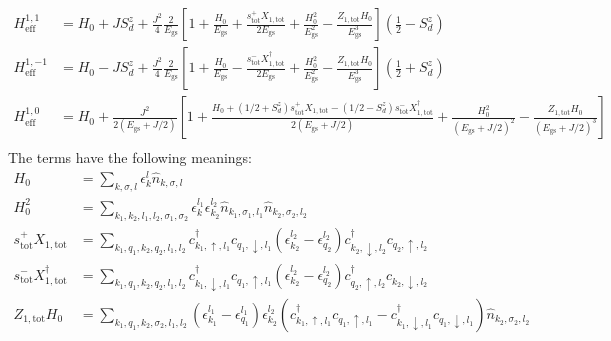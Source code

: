 \documentclass{revtex4-2}
\begin{document}
\begin{align}
	H_\text{eff}^{1, 1} &= H_0 + J S_d^z + \frac{J^2}{4}\frac{2}{E_\text{gs}}\left[1 + \frac{H_0}{E_\text{gs}} + \frac{s^+_\text{tot}X_{1,\text{tot}}}{2 E_\text{gs}} + \frac{H_0^2 }{E_\text{gs}^2} - \frac{Z_{1,\text{tot}} H_0}{E_\text{gs}^3}\right] \left(\frac{1}{2} - S_d^z\right) \\
	H_\text{eff}^{1, -1} &= H_0 - J S_d^z + \frac{J^2}{4}\frac{2}{E_\text{gs}}\left[1 + \frac{H_0}{E_\text{gs}}  - \frac{s^-_\text{tot}X^\dagger_{1,\text{tot}}}{2 E_\text{gs}}  + \frac{H_0^2}{E_\text{gs}^2}  - \frac{ Z_{1,\text{tot}} H_0}{E_\text{gs}^3}\right] \left(\frac{1}{2} + S_d^z\right) \\
	H_\text{eff}^{1, 0} &= H_0 + \frac{J^2}{2\left(E_\text{gs} + J/2\right)}\left[1 + \frac{ H_0 + \left(1/2 + S_d^z\right) s^+_\text{tot}X_{1,\text{tot}} - \left(1/2 - S_d^z\right) s^-_\text{tot}X^\dagger_{1,\text{tot}}}{2 \left(E_\text{gs} + J/2\right)} + \frac{H_0^2}{\left(E_\text{gs} + J/2\right)^2} - \frac{Z_{1,\text{tot}} H_0}{\left(E_\text{gs} + J/2\right)^3} \right] \\
\end{align}
The terms have the following meanings:
\begin{align}
	H_0 &= \sum_{k,\sigma,l}\epsilon_k^l \hat n_{k,\sigma,l}\\
	H_0^2 &= \sum_{k_1,k_2,l_1,l_2,\sigma_1,\sigma_2}\epsilon_k^{l_1}\epsilon_{k_2}^{l_2} \hat n_{k_1,\sigma_1,l_1}\hat n_{k_2,\sigma_2,l_2}\\
	s^+_\text{tot}X_{1,\text{tot}} &= \sum_{k_1,q_1,k_2,q_2,l_1,l_2}c^\dagger_{k_1, \uparrow, l_1}c_{q_1, \downarrow, l_1} \left(\epsilon_{k_2}^{l_2} - \epsilon_{q_2}^{l_2}\right) c^\dagger_{k_2, \downarrow, l_2}c_{q_2, \uparrow, l_2}\\
	s^-_\text{tot}X^\dagger_{1,\text{tot}} &= \sum_{k_1,q_1,k_2,q_2,l_1,l_2}c^\dagger_{k_1, \downarrow, l_1}c_{q_1, \uparrow, l_1} \left(\epsilon_{k_2}^{l_2} - \epsilon_{q_2}^{l_2}\right) c^\dagger_{q_2, \uparrow, l_2}c_{k_2, \downarrow, l_2}\\
	Z_{1,\text{tot}} H_0 &= \sum_{k_1,q_1,k_2,\sigma_2,l_1,l_2}\left(\epsilon_{k_1}^{l_1} - \epsilon_{q_1}^{l_1}\right) \epsilon_{k_2}^{l_2} \left(c^\dagger_{k_1, \uparrow, l_1}c_{q_1, \uparrow, l_1} - c^\dagger_{k_1, \downarrow, l_1}c_{q_1, \downarrow, l_1}\right) \hat n_{k_2,\sigma_2,l_2}\\
\end{align}
\end{document}
